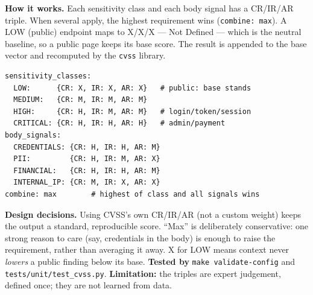 \textbf{How it works.} Each sensitivity class and each body signal has a CR/IR/AR
triple. When several apply, the highest requirement wins (\texttt{combine: max}).
A LOW (public) endpoint maps to X/X/X --- Not Defined --- which is the neutral
baseline, so a public page keeps its base score. The result is appended to the
base vector and recomputed by the \texttt{cvss} library.

\begin{lstlisting}[caption={The context-to-requirements mapping (\texttt{config/cvss\_mapping.yaml}).}]
sensitivity_classes:
  LOW:      {CR: X, IR: X, AR: X}   # public: base stands
  MEDIUM:   {CR: M, IR: M, AR: M}
  HIGH:     {CR: H, IR: M, AR: M}   # login/token/session
  CRITICAL: {CR: H, IR: H, AR: H}   # admin/payment
body_signals:
  CREDENTIALS: {CR: H, IR: H, AR: M}
  PII:         {CR: H, IR: M, AR: X}
  FINANCIAL:   {CR: H, IR: H, AR: M}
  INTERNAL_IP: {CR: M, IR: X, AR: X}
combine: max        # highest of class and all signals wins
\end{lstlisting}

\begin{center}
\end{center}

\textbf{Design decisions.} Using CVSS's own CR/IR/AR (not a custom weight) keeps
the output a standard, reproducible score. ``Max'' is deliberately
conservative: one strong reason to care (say, credentials in the body) is enough
to raise the requirement, rather than averaging it away. X for LOW means context
never \emph{lowers} a public finding below its base.
\textbf{Tested by} \texttt{make validate-config} and \texttt{tests/unit/test\_cvss.py}.
\textbf{Limitation:} the triples are expert judgement, defined once; they are not
learned from data.

